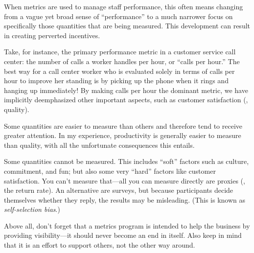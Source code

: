   When metrics are used to manage
staff performance, this often means changing from a vague yet broad sense of
``performance'' to a much narrower focus on specifically those quantities that are being
measured. This development can result in creating perverted
incentives.\vfill\pagebreak

Take, for instance, the primary performance metric in a customer
service call center: the number of calls a worker handles per hour, or
``calls per hour.''  The best way for a call center worker who is
evaluated solely in terms of calls per hour to improve her standing is by
picking up the phone when it rings and hanging up immediately! By
making calls per hour the dominant metric, we have implicitly
deemphasized other important aspects, such as customer satisfaction
(\ie, quality).

Some quantities are easier to measure than others and therefore tend
to receive greater attention. In my experience, productivity is
generally easier to measure than quality, with all the unfortunate
consequences this entails.


   Some quantities cannot be measured. This includes ``soft'' factors
such as culture, commitment, and fun; but also some very ``hard'' factors
like customer satisfaction. You can't measure that---all you can
measure directly are proxies (\eg, the return rate). An alternative are
surveys, but because participants decide themselves whether they
reply, the results may be misleading.  (This is known as
\emph{self-selection bias}.)

% 

    
Above all, don't forget that a metrics program is intended to help the
business by providing visibility---it should never become an end in
itself. Also keep in mind that it is an effort to support others, not
the other way around.


